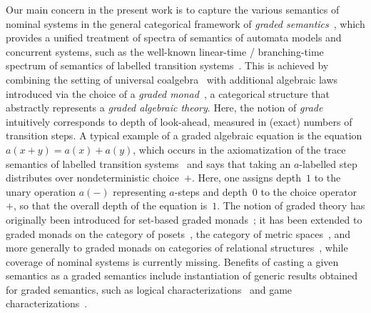 \documentclass[a4paper,UKenglish,cleveref,thm-restate,numberwithinsect,final]{lipics-v2021}
\theoremstyle{plain}
\numberwithin{equation}{section}
\newcommand{\+}[1]{\mathcal{#1}\xspace}
\theoremstyle{definition}
\begin{document}
Our main concern in the present work is to capture the various
semantics of nominal systems in the general categorical framework of
\emph{graded semantics}~\cite{MiliusEA15}, which provides a unified
treatment of spectra of semantics of automata models and concurrent
systems, such as the well-known linear-time / branching-time spectrum
of semantics of labelled transition systems~\cite{DorschEA19}. This is
achieved by combining the setting of universal
coalgebra~\cite{Rutten00} with additional algebraic laws introduced
via the choice of a \emph{graded monad}~\cite{Smirnov08}, a
categorical structure that abstractly represents a \emph{graded
  algebraic theory}. Here, the notion of \emph{grade} intuitively
corresponds to depth of look-ahead, measured in (exact) numbers of
transition steps. A typical example of a graded algebraic equation is
the equation $a(x+y)=a(x)+a(y)$, which occurs in the axiomatization of
the trace semantics of labelled transition systems~\cite{DorschEA19}
and says that taking an $a$-labelled step distributes over
nondeterministic choice~$+$. Here, one assigns depth~$1$ to the unary
operation $a(-)$ representing $a$-steps and depth~$0$ to the choice
operator~$+$, so that the overall depth of the equation is~$1$. The
notion of graded theory has originally been introduced for set-based
graded monads~\cite{Smirnov08}; it has been extended to graded monads
on the category of posets~\cite{FordEA21}, the category of metric
spaces~\cite{ForsterEA25a}, and more generally to graded monads on
categories of relational structures~\cite{FordThesis,ForsterEA25b},
while coverage of nominal systems is currently missing. Benefits of
casting a given semantics as a graded semantics include instantiation
of generic results obtained for graded semantics, such as logical
characterizations~\cite{MiliusEA15,DorschEA19,FordEA21,ForsterEA25a}
and game characterizations~\cite{FordEA22,ForsterEA25b}.
\end{document}
